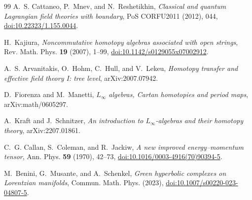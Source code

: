 \documentclass[11pt]{article}
\theoremstyle{definition}
\theoremstyle{remark}
\begin{document}
\begin{thebibliography}{99}
A.~S. Cattaneo, P.~Mnev, and N.~Reshetikhin,
\emph{Classical and quantum Lagrangian field theories with boundary},
PoS CORFU2011 (2012), 044,
\href{https://doi.org/10.22323/1.155.0044}{doi:10.22323/1.155.0044}.

H.~Kajiura,
\emph{Noncommutative homotopy algebras associated with open strings},
Rev. Math. Phys. \textbf{19} (2007), 1--99,
\href{https://doi.org/10.1142/s0129055x07002912}{doi:10.1142/s0129055x07002912}.

A.~S. Arvanitakis, O.~Hohm, C.~Hull, and V.~Lekeu,
\emph{Homotopy transfer and effective field theory I: tree level},
arXiv:2007.07942.

D.~Fiorenza and M.~Manetti,
\emph{$L_\infty$ algebras, Cartan homotopies and period maps},
arXiv:math/0605297.

A.~Kraft and J.~Schnitzer,
\emph{An introduction to $L_\infty$-algebras and their homotopy theory},
arXiv:2207.01861.

C.~G. Callan, S.~Coleman, and R.~Jackiw,
\emph{A new improved energy--momentum tensor},
Ann. Phys. \textbf{59} (1970), 42--73,
\href{https://doi.org/10.1016/0003-4916(70)90394-5}{doi:10.1016/0003-4916(70)90394-5}.

M.~Benini, G.~Musante, and A.~Schenkel,
\emph{Green hyperbolic complexes on Lorentzian manifolds},
Commun. Math. Phys. (2023),
\href{https://doi.org/10.1007/s00220-023-04807-5}
{doi:10.1007/s00220-023-04807-5}.

\end{thebibliography}
\end{document}
